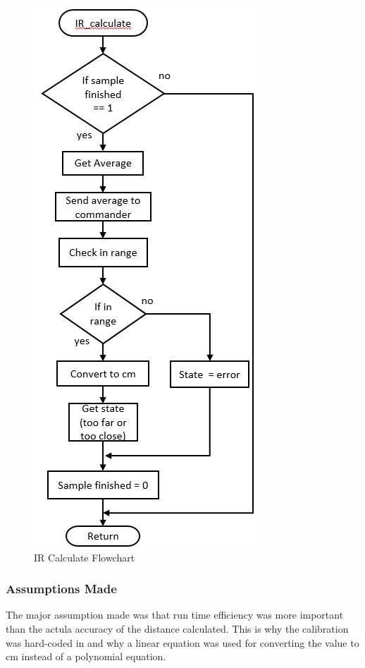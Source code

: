 \documentclass{article}
\begin{document}
\begin{figure}[h]
	\includegraphics[scale=0.8]{IR_calculate.jpg}
	\centering
	\caption{IR Calculate Flowchart}
\end{figure}

\subsubsection{Assumptions Made}
The major assumption made was that run time efficiency was more important than the actula accuracy of the distance calculated. This is why the calibration was hard-coded in and why a linear equation was used for converting the value to cm instead of a polynomial equation.
\end{document}
